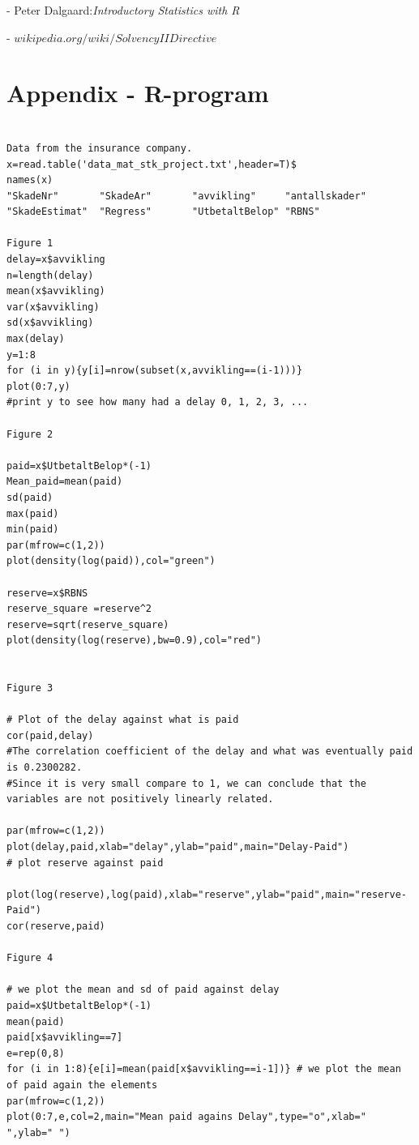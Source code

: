 \documentclass[a4paper]{article}
\begin{document}
- Peter Dalgaard:\textit{Introductory Statistics with R}


- \textit{$wikipedia.org/wiki/Solvency II Directive$} \\

\section{Appendix - R-program}








\begin{verbatim}

Data from the insurance company.
x=read.table('data_mat_stk_project.txt',header=T)$
names(x)
"SkadeNr"       "SkadeAr"       "avvikling"     "antallskader" 
"SkadeEstimat"  "Regress"       "UtbetaltBelop" "RBNS"         
 
Figure 1
delay=x$avvikling
n=length(delay)
mean(x$avvikling)
var(x$avvikling)
sd(x$avvikling)
max(delay)
y=1:8
for (i in y){y[i]=nrow(subset(x,avvikling==(i-1)))}
plot(0:7,y)
#print y to see how many had a delay 0, 1, 2, 3, ...

Figure 2

paid=x$UtbetaltBelop*(-1)
Mean_paid=mean(paid)
sd(paid)
max(paid)
min(paid)
par(mfrow=c(1,2))
plot(density(log(paid)),col="green")

reserve=x$RBNS
reserve_square =reserve^2
reserve=sqrt(reserve_square)
plot(density(log(reserve),bw=0.9),col="red")


Figure 3

# Plot of the delay against what is paid
cor(paid,delay)
#The correlation coefficient of the delay and what was eventually paid is 0.2300282.
#Since it is very small compare to 1, we can conclude that the variables are not positively linearly related. 

par(mfrow=c(1,2))
plot(delay,paid,xlab="delay",ylab="paid",main="Delay-Paid")
# plot reserve against paid

plot(log(reserve),log(paid),xlab="reserve",ylab="paid",main="reserve-Paid")
cor(reserve,paid)

Figure 4

# we plot the mean and sd of paid against delay
paid=x$UtbetaltBelop*(-1)
mean(paid)
paid[x$avvikling==7]
e=rep(0,8)           
for (i in 1:8){e[i]=mean(paid[x$avvikling==i-1])} # we plot the mean of paid again the elements
par(mfrow=c(1,2))
plot(0:7,e,col=2,main="Mean paid agains Delay",type="o",xlab=" ",ylab=" ")


\end{verbatim}
\end{document}
